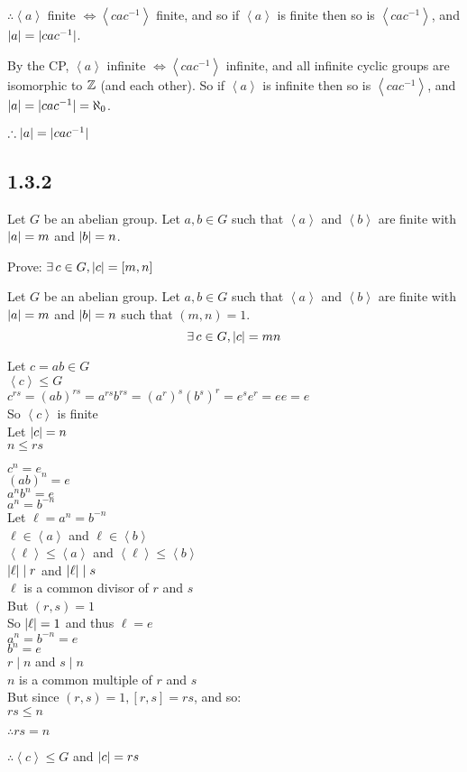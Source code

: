\documentclass[letterpaper,12pt,fleqn]{article}
\newcommand{\cycle}[1]{\left<#1\right>}
\renewcommand{\l}{\ell}
\begin{document}
\begin{enumerate}
  $\therefore\cycle{a}$ finite $\iff\cycle{cac^{-1}}$ finite, and so if
  $\cycle{a}$ is finite then so is $\cycle{cac^{-1}}$, and
  $\lvert a\rvert=\lvert cac^{-1}\rvert$.

  By the CP, $\cycle{a}$ infinite $\iff\cycle{cac^{-1}}$ infinite, and all
  infinite cyclic groups are isomorphic to $\mathbb{Z}$ (and each other). So if
  $\cycle{a}$ is infinite then so is $\cycle{cac^{-1}}$, and
  $\lvert a\rvert=\lvert cac^{-1}\rvert=\aleph_0$.

  $\therefore\lvert a\rvert=\lvert cac^{-1}\rvert$
\end{enumerate}

\subsection*{1.3.2}

Let $G$ be an abelian group. Let $a,b\in G$ such that $\cycle{a}$ and
$\cycle{b}$ are finite with $\lvert a\rvert=m$ and $\lvert b\rvert=n$.

Prove: $\exists\,c\in G,\lvert c\rvert=[m,n]$

\begin{lemma}
Let $G$ be an abelian group. Let $a,b\in G$ such that $\cycle{a}$ and
$\cycle{b}$ are finite with $\lvert a\rvert=m$ and $\lvert b\rvert=n$ such that $(m,n)=1$.
\[\exists\,c\in G,\lvert c\rvert=mn\]
\end{lemma}

\begin{theproof}
  Let $c=ab\in G$ \\
  $\cycle{c}\le G$ \\
  $c^{rs}=(ab)^{rs}=a^{rs}b^{rs}=(a^r)^s(b^s)^r=e^se^r=ee=e$ \\
  So $\cycle{c}$ is finite \\
  Let $\lvert c\rvert=n$ \\
  $n\le rs$

  $c^n=e$ \\
  $(ab)^n=e$ \\
  $a^nb^n=e$ \\
  $a^n=b^{-n}$ \\
  Let $\l=a^n=b^{-n}$ \\
  $\l\in\cycle{a}$ and $\l\in\cycle{b}$ \\
  $\cycle{\l}\le\cycle{a}$ and $\cycle{\l}\le\cycle{b}$ \\
  $\abs{\l}\mid r$ and $\abs{\l}\mid s$ \\
  $\l$ is a common divisor of $r$ and $s$ \\
  But $(r,s)=1$ \\
  So $\abs{\l}=1$ and thus $\l=e$ \\
  $a^n=b^{-n}=e$ \\
  $b^n=e$ \\
  $r\mid n$ and $s\mid n$ \\
  $n$ is a common multiple of $r$ and $s$ \\
  But since $(r,s)=1, [r,s]=rs$, and so: \\
  $rs\le n$

  $\therefore rs=n$

  $\therefore\cycle{c}\le G$ and $\lvert c\rvert=rs$
\end{theproof}
\end{document}
